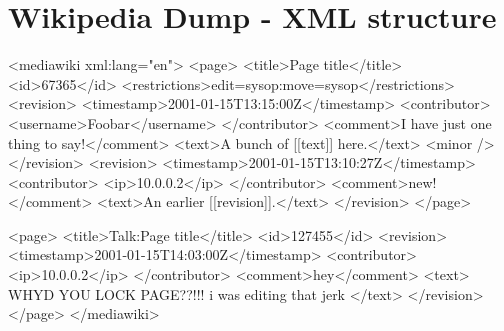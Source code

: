 \section{Wikipedia Dump - XML structure}\label{sec::wikidump}

\begin{code}[caption=Wikipedia Dump - XML representation]
<mediawiki xml:lang="en">
  <page>
    <title>Page title</title>
    <id>67365</id>
    <restrictions>edit=sysop:move=sysop</restrictions>
    <revision>
      <timestamp>2001-01-15T13:15:00Z</timestamp>
      <contributor>
        <username>Foobar</username>
      </contributor>
      <comment>I have just one thing to say!</comment>
      <text>A bunch of [[text]] here.</text>
      <minor />
    </revision>
    <revision>
      <timestamp>2001-01-15T13:10:27Z</timestamp>
      <contributor>
        <ip>10.0.0.2</ip>
      </contributor>
      <comment>new!</comment>
      <text>An earlier [[revision]].</text>
    </revision>
  </page>
    
  <page>
    <title>Talk:Page title</title>
    <id>127455</id>
    <revision>
      <timestamp>2001-01-15T14:03:00Z</timestamp>
      <contributor>
        <ip>10.0.0.2</ip>
      </contributor>
      <comment>hey</comment>
      <text>
        WHYD YOU LOCK PAGE??!!! i was editing that jerk
      </text>
    </revision>
  </page>
</mediawiki>
\end{code}
\label{lst:wikixml}
